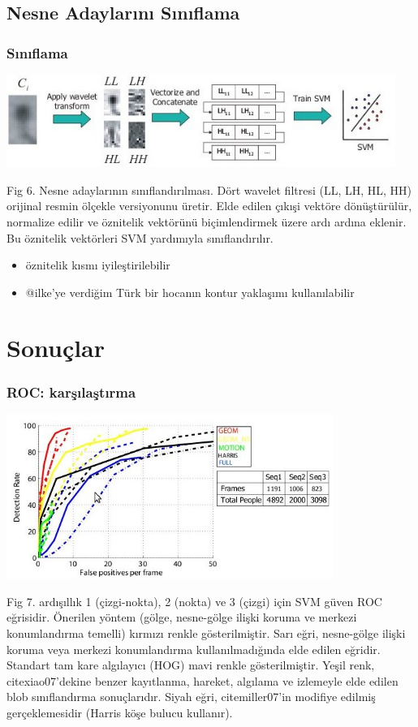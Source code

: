 \documentclass{beamer}
\begin{document}
\subsection{Nesne Adaylarını Sınıflama}

\begin{frame}
	\frametitle{Sınıflama}

	\includegraphics[width=0.95\textwidth]{img/fig6.jpg}\label{fig:classification}

	Fig 6. Nesne adaylarının sınıflandırılması. Dört wavelet filtresi (LL, LH,
	HL, HH) orijinal resmin ölçekle versiyonunu üretir. Elde edilen çıkışi
	vektöre dönüştürülür, normalize edilir ve öznitelik vektörünü biçimlendirmek
	üzere ardı ardına eklenir. Bu öznitelik vektörleri SVM yardımıyla
	sınıflandırılır.

	\begin{itemize}
		\item öznitelik kısmı iyileştirilebilir
		\item @ilke'ye verdiğim Türk bir hocanın kontur yaklaşımı kullanılabilir
	\end{itemize}
\end{frame}

\section{Sonuçlar}

\begin{frame}
	\frametitle{ROC: karşılaştırma}

	\includegraphics[width=0.8\textwidth]{img/fig7.jpg}\label{fig:ROC}

	\begin{scriptsize}
		Fig 7. ardışıllık 1 (çizgi-nokta), 2 (nokta) ve 3 (çizgi) için SVM güven ROC
		eğrisidir. Önerilen yöntem (gölge, nesne-gölge ilişki koruma ve merkezi
		konumlandırma temelli) kırmızı renkle gösterilmiştir. Sarı eğri, nesne-gölge
		ilişki koruma veya merkezi konumlandırma kullanılmadığında elde edilen
		eğridir. Standart tam kare algılayıcı (HOG) mavi renkle gösterilmiştir.
		Yeşil renk, cite{xiao07}'dekine benzer kayıtlanma, hareket, algılama ve
		izlemeyle elde edilen blob sınıflandırma sonuçlarıdır. Siyah eğri,
		cite{miller07}'in modifiye edilmiş gerçeklemesidir (Harris köşe bulucu
		kullanır).
	\end{scriptsize}
\end{frame}
\end{document}
